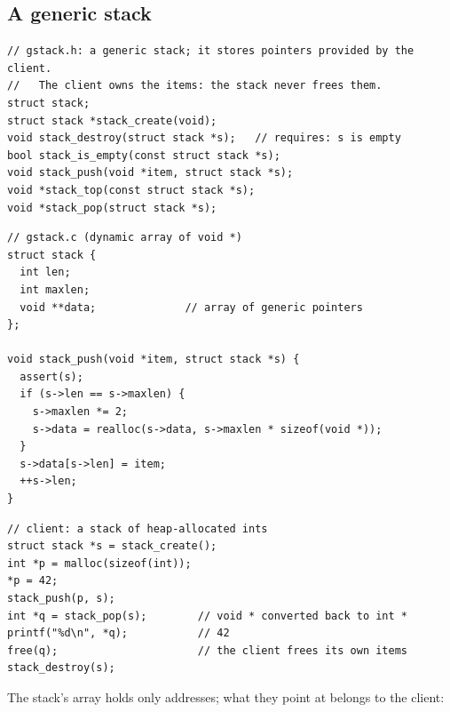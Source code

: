 \subsection{A generic stack}
\begin{lstlisting}[style=c]
// gstack.h: a generic stack; it stores pointers provided by the client.
//   The client owns the items: the stack never frees them.
struct stack;
struct stack *stack_create(void);
void stack_destroy(struct stack *s);   // requires: s is empty
bool stack_is_empty(const struct stack *s);
void stack_push(void *item, struct stack *s);
void *stack_top(const struct stack *s);
void *stack_pop(struct stack *s);
\end{lstlisting}
\begin{lstlisting}[style=c]
// gstack.c (dynamic array of void *)
struct stack {
  int len;
  int maxlen;
  void **data;              // array of generic pointers
};

void stack_push(void *item, struct stack *s) {
  assert(s);
  if (s->len == s->maxlen) {
    s->maxlen *= 2;
    s->data = realloc(s->data, s->maxlen * sizeof(void *));
  }
  s->data[s->len] = item;
  ++s->len;
}
\end{lstlisting}
\begin{lstlisting}[style=c]
// client: a stack of heap-allocated ints
struct stack *s = stack_create();
int *p = malloc(sizeof(int));
*p = 42;
stack_push(p, s);
int *q = stack_pop(s);        // void * converted back to int *
printf("%d\n", *q);           // 42
free(q);                      // the client frees its own items
stack_destroy(s);
\end{lstlisting}

The stack's array holds only addresses; what they point at belongs to the client:

\begin{center}
\end{center}

